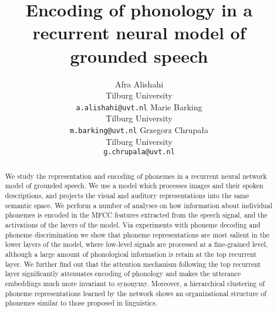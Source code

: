 \documentclass[11pt,a4paper]{article}
\title{Encoding of phonology in a recurrent neural model of grounded speech}
\author{
  Afra Alishahi\\
  Tilburg University\\
  {\tt a.alishahi@uvt.nl}
  \And Marie Barking\\
  Tilburg University\\
  {\tt m.barking@uvt.nl}
 \And Grzegorz Chrupała\\
  Tilburg University\\
  {\tt g.chrupala@uvt.nl}}
\date{}
\begin{document}
\maketitle

\begin{abstract}
  We study the representation and encoding of phonemes in a recurrent
  neural network model of grounded speech. We use a model which
  processes images and their spoken descriptions, and projects the
  visual and auditory representations into the same semantic space. We
  perform a number of analyses on how information about individual
  phonemes is encoded in the MFCC features extracted from the speech
  signal, and the activations of the layers of the model. Via
  experiments with phoneme decoding and phoneme discrimination we show
  that phoneme representations are most salient in the lower layers of
  the model, where low-level signals are processed at a fine-grained
  level, although a large amount of phonological information is retain at
  the top recurrent layer. We further find out that the
  attention mechanism following the top recurrent layer significantly
  attenuates encoding of phonology and makes the utterance embeddings
  much more invariant to synonymy. Moreover, a hierarchical clustering
  of phoneme representations learned by the network shows an
  organizational structure of phonemes similar to those proposed in
  linguistics.
\end{abstract}











\appendix
\end{document}
